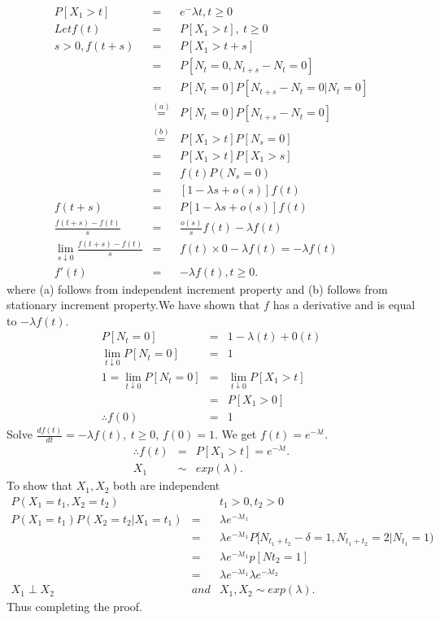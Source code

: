 \documentclass[a4paper,10pt]{article}
\theoremstyle{plain}
\theoremstyle{definition}
\begin{document}
\begin{eqnarray*}
  P[X_{1}>t] &=&  e^-\lambda t, t\geq 0\\
  Let f(t) &=& P[X_{1}>t],~ t\geq 0 \\
  s>0, f(t+s) &=&   P[X_{1}>t+s]\\
   &=& P[N_{t}=0, N_{t+s}-N_{t}=0]  \\
   &=& P[N_{t}=0] P[N_{t+s}-N_{t}=0|N_{t}=0 ] \\
   &\stackrel{(a)}{=}& P[N_{t}=0] P[ N_{t+s}-N_{t}=0]\\
   &\stackrel{(b)}{=}&  P[X_{1}>t] P[N_{s}=0]  \\
   &=& P[X_{1}>t] P[X_{1}>s] \\
   &=& f(t) P(N_{s}=0) \\
   &=& [1- \lambda s + o(s)] f(t) \\
  f(t+s) &=& P [1- \lambda s + o(s)] f(t)\\
  \frac{f(t+s)-f(t)}{s} &=& \frac{o(s)}{s}f(t)- \lambda f(t) \\
  \lim_{s\downarrow0}  \frac{f(t+s)-f(t)}{s}  &=& f(t) \times 0 - \lambda f(t) = -\lambda f(t) \\
 f'(t) &=& - \lambda f(t), t\geq 0.
\end{eqnarray*}
where (a) follows from independent increment property and (b) follows from stationary increment property.We have shown that $f$ has a derivative and is equal to $-\lambda f(t)$.\\
\begin{eqnarray*}
   P[N_{t}=0] &=& 1- \lambda (t)+ 0(t) \\
  \lim _{t\downarrow0}P[N_{t}=0] &=& 1 \\
  1= \lim _{t\downarrow0}P[N_{t}=0]&=& \lim _{t\downarrow0}P[X_{1}>t] \\
   &=& P[X_{1}>0]  \\
  \therefore f(0) &=& 1
  \end{eqnarray*}
  Solve $\frac{df(t)}{dt} = -\lambda f(t), ~t\geq 0$, $f(0)= 1$. We get $f(t) = e^{-\lambda t}$.
   \begin{eqnarray*}
  \therefore f(t) &=&  P[X_{1}>t]= e^{-\lambda t}.\\
  X_{1}&\sim & exp (\lambda ).
\end{eqnarray*}
To show that $X_{1}, X_{2}$ both are independent\\
\begin{eqnarray*}
 P(X_{1}=t_{1}, X_{2}=t_{2}) && t_{1} >0, t_{2}>0\\
  P(X_{1}=t_{1})P (X_{2}=t_{2}| X_{1}=t_{1})&=& \lambda e^{-\lambda t_{1}} \\
   &=& \lambda e^{-\lambda t_{1}} P[N_{t_{1}+t_{2}}-\delta=1,N_{t_{1}+t_{2}}=2|N_{t_{1}}=1) \\
   &=& \lambda e^{-\lambda t_{1}} p[Nt_{2}=1] \\
   &=& \lambda e^{-\lambda t_{1}} \lambda e^{-\lambda t_{2}}  \\
   X_{1} \perp X_{2}&and & X_{1}, X_{2} \sim exp (\lambda).
\end{eqnarray*}
Thus completing the proof. 
\end{document}

